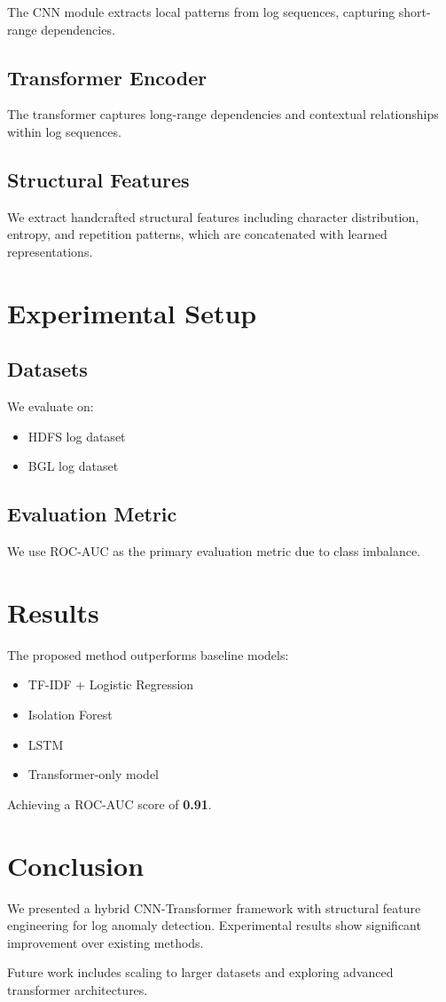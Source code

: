 \documentclass[11pt]{article}
\begin{document}
The CNN module extracts local patterns from log sequences, capturing short-range dependencies.

\subsection{Transformer Encoder}

The transformer captures long-range dependencies and contextual relationships within log sequences.

\subsection{Structural Features}

We extract handcrafted structural features including character distribution, entropy, and repetition patterns, which are concatenated with learned representations.

\section{Experimental Setup}

\subsection{Datasets}

We evaluate on:
\begin{itemize}
\item HDFS log dataset
\item BGL log dataset
\end{itemize}

\subsection{Evaluation Metric}

We use ROC-AUC as the primary evaluation metric due to class imbalance.

\section{Results}

The proposed method outperforms baseline models:

\begin{itemize}
\item TF-IDF + Logistic Regression
\item Isolation Forest
\item LSTM
\item Transformer-only model
\end{itemize}

Achieving a ROC-AUC score of \textbf{0.91}.

\section{Conclusion}

We presented a hybrid CNN-Transformer framework with structural feature engineering for log anomaly detection. Experimental results show significant improvement over existing methods.

Future work includes scaling to larger datasets and exploring advanced transformer architectures.
\end{document}
